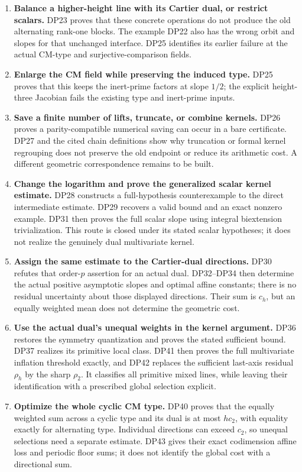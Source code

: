 \documentclass[11pt,a4paper]{article}
\theoremstyle{definition}\newtheorem{remark}[theorem]{Remark}
\begin{document}
\begin{enumerate}[leftmargin=*,label=\arabic*.]
\item \textbf{Balance a higher-height line with its Cartier dual, or restrict scalars.} DP23 proves that these concrete operations do not produce the old alternating rank-one blocks. The example DP22 also has the wrong orbit and slopes for that unchanged interface. DP25 identifies its earlier failure at the actual CM-type and surjective-comparison fields.
\item \textbf{Enlarge the CM field while preserving the induced type.} DP25 proves that this keeps the inert-prime factors at slope $1/2$; the explicit height-three Jacobian fails the existing type and inert-prime inputs.
\item \textbf{Save a finite number of lifts, truncate, or combine kernels.} DP26 proves a parity-compatible numerical saving can occur in a bare certificate. DP27 and the cited chain definitions show why truncation or formal kernel regrouping does not preserve the old endpoint or reduce its arithmetic cost. A different geometric correspondence remains to be built.
\item \textbf{Change the logarithm and prove the generalized scalar kernel estimate.} DP28 constructs a full-hypothesis counterexample to the direct intermediate estimate. DP29 recovers a valid bound and an exact nonzero example. DP31 then proves the full scalar slope using integral biextension trivialization. This route is closed under its stated scalar hypotheses; it does not realize the genuinely dual multivariate kernel.
\item \textbf{Assign the same estimate to the Cartier-dual directions.} DP30 refutes that order-$p$ assertion for an actual dual. DP32--DP34 then determine the actual positive asymptotic slopes and optimal affine constants; there is no residual uncertainty about those displayed directions. Their sum is $c_h$, but an equally weighted mean does not determine the geometric cost.
\item \textbf{Use the actual dual's unequal weights in the kernel argument.} DP36 restores the symmetry quantization and proves the stated sufficient bound. DP37 realizes its primitive local class. DP41 then proves the full multivariate inflation threshold exactly, and DP42 replaces the sufficient last-axis residual $\rho_h$ by the sharp $\rho_2$. It classifies all primitive mixed lines, while leaving their identification with a prescribed global selection explicit.
\item \textbf{Optimize the whole cyclic CM type.} DP40 proves that the equally weighted sum across a cyclic type and its dual is at most $hc_2$, with equality exactly for alternating type. Individual directions can exceed $c_2$, so unequal selections need a separate estimate. DP43 gives their exact codimension affine loss and periodic floor sums; it does not identify the global cost with a directional sum.

\end{enumerate}
\end{document}
